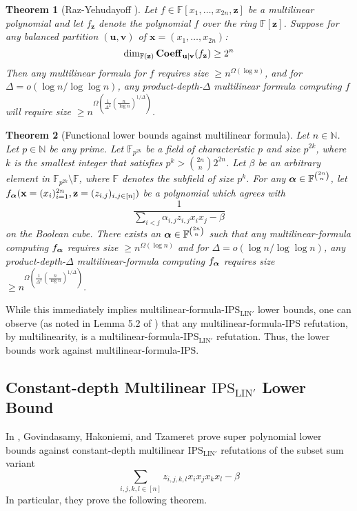 \documentclass[11pt]{article}
\newtheorem{theorem}{Theorem}[section]
\newcommand{\F}{\mathbb{F}}
\newcommand{\IPS}{\mathrm{IPS}}
\newcommand{\IPSLINp}{\mathrm{IPS}_{\mathrm{LIN}'}}
\begin{document}
\begin{theorem}[Raz-Yehudayoff \cite{RY09}\cite{Raz-2009}]
    Let $f \in \F[x_1, \dots, x_{2n}, \mathbf{z}]$ be a multilinear polynomial and let $f_{\mathbf{z}}$ denote the polynomial $f$ over the ring $\F[\mathbf{z}]$. Suppose for any balanced partition $(\mathbf{u}, \mathbf{v})$ of $\mathbf{x} = (x_1, \dots, x_{2n})$: $$\dim_{\F(\mathbf{z})} \bfCoeff_{\mathbf{u} | \mathbf{v}}(f_\mathbf{z}) \geq 2^n$$
    Then any multilinear formula for $f$ requires size $\geq n^{\Omega(\log n)}$, and for $\Delta = o(\log n / \log \log n)$, any product-depth-$\Delta$ multilinear formula computing $f$ will require size $\geq n^{\Omega\left(\frac{1}{\Delta^2}(\frac{n}{\log n})^{1/\Delta}\right )}$. 
\end{theorem}
\begin{theorem}[Functional lower bounds against multilinear formula]\label{thm:multilinear-formula-lbds-via-raz-yehudayoff}
    Let $n\in \mathbb{N}$. Let $p\in \mathbb{N}$ be any prime. Let $\F_{p^{2k}}$ be a field of characteristic $p$ and size $p^{2k}$, where $k$ is the smallest integer that satisfies $p^k > \binom{2n}{n}2^{2n}$. Let $\beta$ be an arbitrary element in $\F_{p^{2k}}\setminus\F$, where $\F$ denotes the subfield of size $p^k$. For any $\bfalpha \in \F^{\binom{2n}{n}}$, let $f_{\boldsymbol{\alpha}}(\mathbf{x}=(x_i)_{i=1}^{2n},\mathbf{z}=(z_{i,j})_{i,j\in[n]})$ be a polynomial which agrees with $$\frac{1}{\sum_{i<j}\alpha_{i,j}z_{i,j}x_ix_j - \beta}$$ on the Boolean cube. There exists an $\bfalpha \in \F^{\binom{2n}{n}}$ such that any multilinear-formula computing $f_{\boldsymbol{\alpha}}$ requires size $\geq n^{\Omega(\log n)}$ and for $\Delta = o(\log n / \log \log n)$, any product-depth-$\Delta$ multilinear-formula computing $f_{\boldsymbol{\alpha}}$ requires size $\geq n^{\Omega\left(\frac{1}{\Delta^2}(\frac{n}{\log n})^{1/\Delta}\right )}$. 
\end{theorem}

While this immediately implies multilinear-formula-$\IPSLINp$ lower bounds, one can observe (as noted in Lemma 5.2 of \cite{FSTW21}) that any multilinear-formula-$\IPS$ refutation, by multilinearity, is a multilinear-formula-$\IPSLINp$ refutation. Thus, the lower bounds work against multilinear-formula-$\IPS$.

\subsection{Constant-depth Multilinear $\IPSLINp$ Lower Bound}

In \cite{GHT}, Govindasamy, Hakoniemi, and Tzameret prove super polynomial lower bounds against constant-depth multilinear $\IPSLINp$ refutations of the subset sum variant $$\sum_{i,j,k,l\in[n]}z_{i,j,k,l}x_ix_jx_kx_l - \beta$$
In particular, they prove the following theorem.
\end{document}
